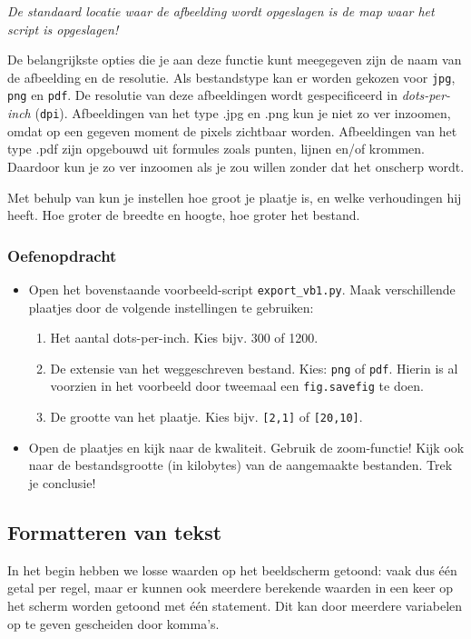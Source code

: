 \documentclass[a4paper,11pt, fleqn]{article}
\begin{document}
{\it De standaard locatie waar de afbeelding wordt opgeslagen is de map waar het script is opgeslagen!}

De belangrijkste opties die je aan deze functie kunt meegegeven zijn de naam van de afbeelding en de resolutie. Als bestandstype kan er worden gekozen voor \verb.jpg., \verb.png. en  \verb.pdf.. 
De resolutie van deze afbeeldingen wordt gespecificeerd in \textit{dots-per-inch}  (\verb,dpi,).
Afbeeldingen van het type .jpg en .png kun je niet zo ver inzoomen, omdat op een gegeven moment de pixels zichtbaar worden. 
Afbeeldingen van het type .pdf zijn opgebouwd uit formules zoals punten, lijnen en/of krommen. Daardoor kun je zo ver inzoomen als je zou willen zonder dat het onscherp wordt.

Met behulp van  kun je instellen hoe groot je plaatje is, en welke verhoudingen hij heeft. Hoe groter de breedte en hoogte, hoe groter het bestand.


\subsubsection*{Oefenopdracht} 
\begin{itemize}
	\item Open het bovenstaande voorbeeld-script \verb,export_vb1.py,. Maak verschillende plaatjes door de volgende instellingen te gebruiken:

	\begin{enumerate}
		\item Het aantal dots-per-inch. Kies bijv. 300 of 1200.
		\item De extensie van het weggeschreven bestand. Kies: \verb,png, of \verb,pdf,. Hierin is al voorzien in het voorbeeld door tweemaal een \verb,fig.savefig, te doen.
		\item De grootte van het plaatje. Kies bijv. \verb=[2,1]= of \verb=[20,10]=.
	\end{enumerate}

	\item Open de plaatjes en kijk naar de kwaliteit. Gebruik de zoom-functie! Kijk ook naar de bestandsgrootte (in kilobytes) van de aangemaakte bestanden. Trek je conclusie!
\end{itemize}

\iffalse
\subsection{Formatteren van tekst}
In het begin hebben we losse waarden op het beeldscherm getoond: vaak dus \'e\'en getal per regel, maar er kunnen ook meerdere berekende waarden in een keer op het scherm worden getoond met \'e\'en  statement. Dit kan door meerdere variabelen op te geven gescheiden door komma's.
\end{document}
